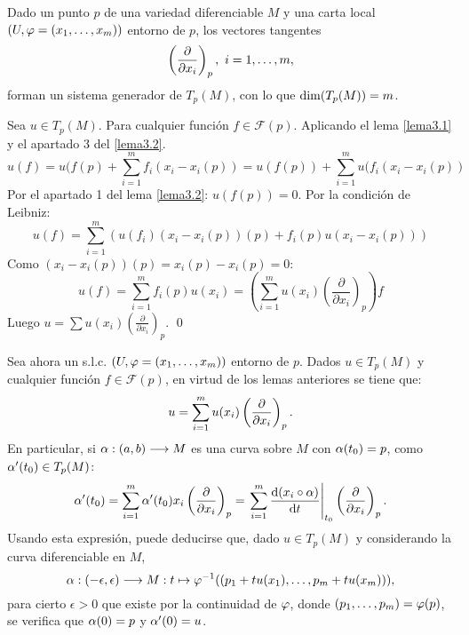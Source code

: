 \documentclass[Cursovd_portada.tex]{subfiles}
\begin{document}
\begin{lemma}\label{lema3.3}
Dado un punto $p$ de una variedad diferenciable $M$ y una carta local $(U,\varphi=(x_1,\dots ,x_m))$ entorno de $p$,
los vectores tangentes
$$\left(\displaystyle{\frac{\partial}{\partial x_i}}\right)_p,\mbox{ }i=1,\dots ,m,$$
forman un sistema generador de $T_p(M)$, con lo que ${\rm dim}(T_p(M))=m$.
\end{lemma}
\begin{dem}
Sea $u \in T_p(M)$. Para cualquier función $f \in \mathcal{F}(p)$. Aplicando el lema \ref{lema3.1} y el apartado 3 del \ref{lema3.2}.
\[ u(f) = u(f(p)+\sum_{i=1}^m f_i(x_i-x_i(p)) = u(f(p)) + \sum_{i=1}^m u(f_i(x_i-x_i(p)) \]
Por el apartado 1 del lema \ref{lema3.2}: $u(f(p))=0$. Por la condición de Leibniz:
\[ u(f) = \sum_{i=1}^m ( u(f_i)(x_i-x_i(p))(p) + f_i(p) u(x_i-x_i(p))) \]
Como $(x_i-x_i(p))(p)=x_i(p)-x_i(p)=0$:
\[ u(f) = \sum_{i=1}^m f_i(p) u(x_i) = \left(\sum_{i=1}^m u(x_i) \left(\frac{\partial}{\partial x_i}\right)_p\right)f \]
Luego $u = \sum u(x_i) \left(\frac{\partial}{\partial x_i}\right)_p$.
\qed
\end{dem}
Sea ahora un s.l.c. $(U,\varphi=(x_1,\dots ,x_m))$ entorno de $p$. Dados $u\in T_p(M)$ y cualquier función
$f\in\mathcal{F}(p)$, en virtud de los lemas anteriores se tiene que:
$$u=\sum_{i=1}^mu(x_i)\left(\displaystyle{\frac{\partial}{\partial x_i}}\right)_p.$$
\hs En particular, si $\alpha:(a,b)\longrightarrow M$ es una curva sobre $M$ con $\alpha(t_0)=p$, como $\alpha'(t_0)\in T_p(M)$:
$$\alpha'(t_0)=\sum_{i=1}^m\alpha'(t_0)x_i\left(\displaystyle{\frac{\partial}{\partial x_i}}\right)_p=
\left.\sum_{i=1}^m\displaystyle{\frac{{\rm d} (x_i\circ\alpha)}{{\rm d} t}}\right|_{t_0}\left(\displaystyle{\frac{\partial}{\partial x_i}}\right)_p.$$ \hs Usando esta expresión, puede
deducirse que, dado $u\in T_p(M)$ y considerando la curva diferenciable en $M$,
$$\alpha:(-\epsilon,\epsilon)\longrightarrow M:t\mapsto \varphi^{-1}((p_1+tu(x_1),\dots ,p_m+tu(x_m))),$$
para cierto $\epsilon>0$ que existe por la continuidad de $\varphi$, donde $(p_1,\dots ,p_m)=\varphi(p)$, se verifica que
$\alpha(0)=p$ y $\alpha'(0)=u$.
\end{document}
